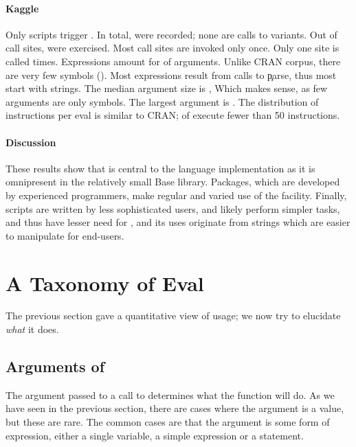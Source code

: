 \documentclass[screen,acmsmall]{acmart}
\begin{document}
\paragraph{Kaggle}
Only \kaggleNbruns scripts trigger \eval. In total, \kaggleAllcalls \eval were
recorded; none are calls to variants. Out of \kaggleStaticeval call sites,
\kaggleTriggeredeval were exercised. Most call sites are invoked only once. Only
one site is called \kaggleMaxcalls times. Expressions amount for
\kaggleCodepercent of arguments. Unlike CRAN corpus, there are very few symbols
(\kaggleSymbolpercent). Most expressions result from calls to \c{parse}, thus
most \evals start with strings. The median argument size is \kaggleMedianszeval,
Which makes sense, as few arguments are only symbols. The largest argument is
\kaggleMaxszeval. The distribution of instructions per eval is similar to CRAN;
\kaggleSmalleventspct of \evals execute fewer than 50 instructions.


\paragraph{Discussion}
These results show that \eval is central to the language implementation as it is
omnipresent in the relatively small Base library. Packages, which are developed
by experienced programmers, make regular and varied use of the facility.
Finally, scripts are written by less sophisticated users, and likely perform
simpler tasks, and thus have lesser need for \eval, and its uses originate from
strings which are easier to manipulate for end-users.

\newpage
\section{A Taxonomy of Eval}

The previous section gave a quantitative view of \eval usage; we now try to
elucidate \emph{what} it does.

\subsection{Arguments of \eval}

The argument passed to a call to \eval determines what the function will do. As
we have seen in the previous section, there are cases where the argument is a
value, but these are rare. The common cases are that the argument is some form
of expression, either a single variable, a simple expression or a statement.
\end{document}
